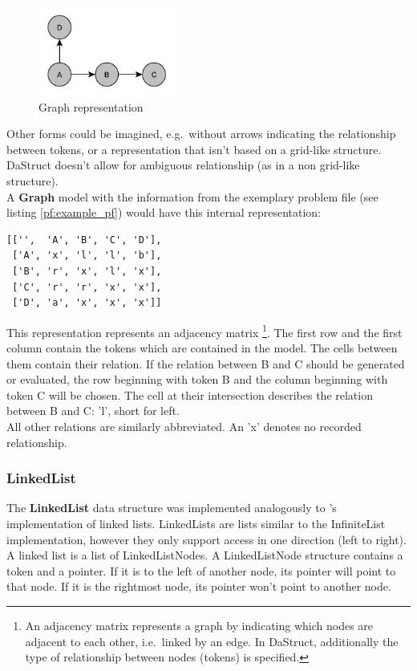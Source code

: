 \documentclass[hidelinks]{scrartcl}
\begin{document}
\begin{figure}[H]
	\caption{Graph representation}
	\label{img:graph_example_pf}
	\centering
	\includegraphics[width=0.4\textwidth]{Illustrations/Graph.pdf}
\end{figure}

Other forms could be imagined, e.g.\ without arrows indicating the relationship between \gls{token}s, or a representation that isn't based on a grid-like structure. DaStruct doesn't allow for ambiguous relationship (as in a non grid-like structure).\\

A \textbf{Graph} model with the information from the exemplary problem file (see listing \ref{pf:example_pf}) would have this internal representation:

\begin{lstlisting}[caption=Graph representation, label=graph_example_pf, frame=single]
[['',  'A', 'B', 'C', 'D'],
 ['A', 'x', 'l', 'l', 'b'],
 ['B', 'r', 'x', 'l', 'x'],
 ['C', 'r', 'r', 'x', 'x'],
 ['D', 'a', 'x', 'x', 'x']]
\end{lstlisting}

This representation represents an adjacency matrix \footnote{An adjacency matrix represents a graph by indicating which nodes are adjacent to each other, i.e.\ linked by an edge. In DaStruct, additionally the type of relationship between nodes (\gls{token}s) is specified.}. The first row and the first column contain the \gls{token}s which are contained in the model. The cells between them contain their relation. If the relation between B and C should be generated or evaluated, the row beginning with \gls{token} B and the column beginning with \gls{token} C will be chosen. The cell at their intersection describes the relation between B and C: 'l', short for left. \\
All other relations are similarly abbreviated. An 'x' denotes no recorded relationship.

\subsubsection{LinkedList}
The \textbf{LinkedList} data structure was implemented analogously to \cite{Krumnack.2011}'s implementation of linked lists. LinkedLists are lists similar to the InfiniteList implementation, however they only support access in one direction (left to right). A linked list is a list of LinkedListNodes.
A LinkedListNode structure contains a \gls{token} and a pointer. If it is to the left of another node, its pointer will point to that node. If it is the rightmost node, its pointer won't point to another node. \\
\end{document}
